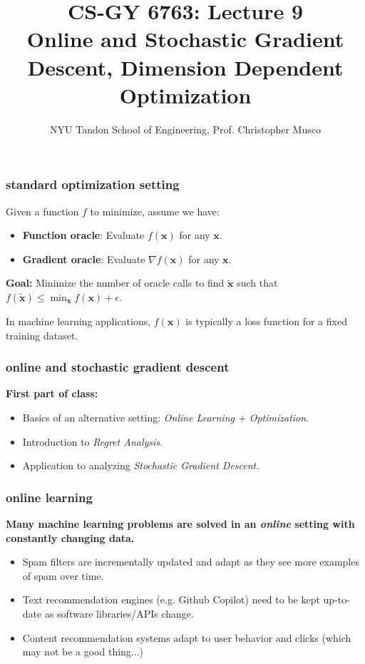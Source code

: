 \documentclass[compress]{beamer}
\title{CS-GY 6763: Lecture 9 \\ Online and Stochastic Gradient Descent, Dimension Dependent Optimization}
\author{NYU Tandon School of Engineering, Prof. Christopher Musco}
\date{}
\newcommand{\bv}[1]{\mathbf{#1}}
\begin{document}
\begin{frame}
	\titlepage 
\end{frame}


\begin{frame}
	\frametitle{standard optimization setting}
	Given a function $f$ to minimize, assume we have:
	\begin{itemize}
		\item \textbf{Function oracle}: Evaluate $f(\bv{x})$ for any $\bv{x}$. 
		\item \textbf{Gradient oracle}: Evaluate $\nabla f(\bv{x})$ for any $\bv{x}$.
	\end{itemize}
	\textbf{Goal:} Minimize the number of oracle calls to find $\tilde{\bv{x}}$ such that $f(\tilde{\bv{x}}) \leq \min_{\bv{x}}f(\bv{x}) + \epsilon$. 

	\begin{center}
	In machine learning applications,  $f(\bv{x})$ is typically  a loss function for a fixed training dataset. 
	\end{center}
\end{frame}

\begin{frame}[t]
	\frametitle{online and stochastic gradient descent}
	\textbf{First part of class:}
	\begin{itemize}
		\item Basics of an alternative setting: \emph{Online Learning + Optimization}. 
		\item Introduction to \emph{Regret Analysis}.
		\item Application to analyzing \emph{Stochastic Gradient Descent.}
	\end{itemize}
	
\end{frame}


\begin{frame}
	\frametitle{online learning}
	\begin{center}
		\textbf{Many machine learning problems are solved in an \emph{online} setting with constantly changing data.}
	\end{center}
	\begin{itemize}
		\item Spam filters are incrementally updated and adapt as they see more examples of spam over time. 
		\item Text recommendation engines (e.g. Github Copilot) need to be kept up-to-date as software libraries/APIs change.
		\item Content recommendation systems adapt to user behavior and clicks (which may not be a good thing...)
	\end{itemize}
\end{frame}
\end{document}
